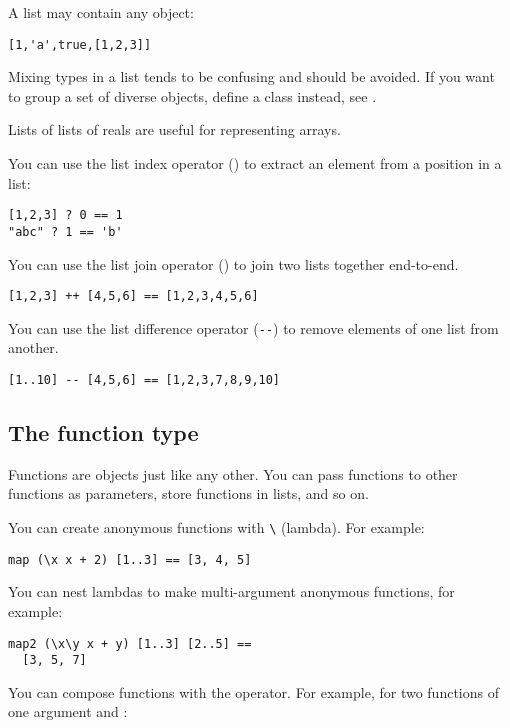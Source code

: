 A list may contain any object:

\begin{verbatim}
[1,'a',true,[1,2,3]] 
\end{verbatim}

\noindent
Mixing types in a list tends to be confusing and should be avoided. If you
want to group a set of diverse objects, define a class instead, 
see .

Lists of lists of reals are useful for representing arrays.

You can use the list index operator () to extract an element from a
position in a list:

\begin{verbatim}
[1,2,3] ? 0 == 1
"abc" ? 1 == 'b'
\end{verbatim}

You can use the list join operator (\ct{++}) to join two lists together
end-to-end.

\begin{verbatim}
[1,2,3] ++ [4,5,6] == [1,2,3,4,5,6]
\end{verbatim}

You can use the list difference operator (\verb+--+) to remove elements of one 
list from another.

\begin{verbatim}
[1..10] -- [4,5,6] == [1,2,3,7,8,9,10]
\end{verbatim}

\subsection{The function type}

Functions are objects just like any other. You can pass functions to other
functions as parameters, store functions in lists, and so on. 

You can create anonymous functions with \verb"\" (lambda). For example:

\begin{verbatim}
map (\x x + 2) [1..3] == [3, 4, 5]
\end{verbatim}

You can nest lambdas to make multi-argument anonymous functions, for example:

\begin{verbatim}
map2 (\x\y x + y) [1..3] [2..5] == 
  [3, 5, 7]
\end{verbatim}

You can compose functions with the  operator. For example, for two
functions of one argument  and :

